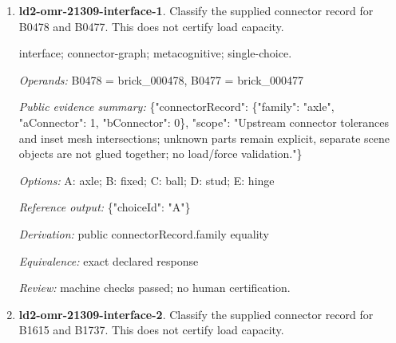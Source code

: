 \begin{enumerate}
\par{\small distance; source-data; atomic; single-choice.\par\textit{Operands:} B1147 = brick\_001147, B0920 = brick\_000920, B1765 = brick\_001765, B1750 = brick\_001750\par\textit{Public evidence summary:} \{"coordinateFrame": "Viewer world, millimeters, Euclidean distance", "centers": \{"B1147": [0, 340, 12], "B1750": [17.7936, 602.4, -18.7872], "B0920": [-26.2216, 6.4, 26.2216], "B1765": [8, 646.4, 28.800012]\}\}\par\textit{Options:} A: B1750; B: B0920; C: B1765\par\textit{Reference output:} \{"choiceId": "A"\}\par\textit{Derivation:} Euclidean norm from public rounded centers\par\textit{Equivalence:} exact declared response\par\textit{Review:} machine checks passed; no human certification.}
\item \textbf{ld2-omr-21309-interface-1}. Classify the supplied connector record for B0478 and B0477. This does not certify load capacity.
\par{\small interface; connector-graph; metacognitive; single-choice.\par\textit{Operands:} B0478 = brick\_000478, B0477 = brick\_000477\par\textit{Public evidence summary:} \{"connectorRecord": \{"family": "axle", "aConnector": 1, "bConnector": 0\}, "scope": "Upstream connector tolerances and inset mesh intersections; unknown parts remain explicit, separate scene objects are not glued together; no load/force validation."\}\par\textit{Options:} A: axle; B: fixed; C: ball; D: stud; E: hinge\par\textit{Reference output:} \{"choiceId": "A"\}\par\textit{Derivation:} public connectorRecord.family equality\par\textit{Equivalence:} exact declared response\par\textit{Review:} machine checks passed; no human certification.}
\item \textbf{ld2-omr-21309-interface-2}. Classify the supplied connector record for B1615 and B1737. This does not certify load capacity.

\end{enumerate}
